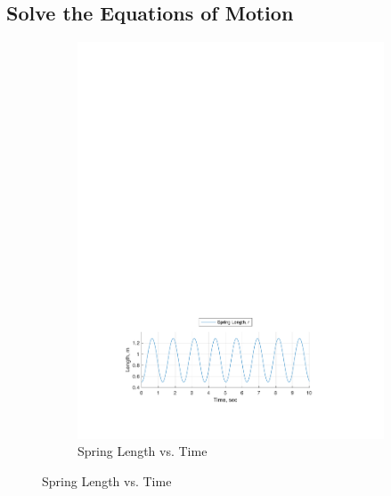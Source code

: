 \documentclass[12pt]{report}
\begin{document}
\begin{flushleft}
\section{Solve the Equations of Motion}
\begin{figure}[!htp]
  \caption{Numerical Solution Motion Behavior Plot, ($\theta_o:~0,~\phi_o:~0$)}
  \begin{subfigure}[t]{\textwidth}
  \includegraphics[center]{spring_0-0}
  \caption{Spring Length vs. Time}
  \label{fig:spring:0:0}
\end{subfigure}
\end{figure}


\end{flushleft}
\end{document}
